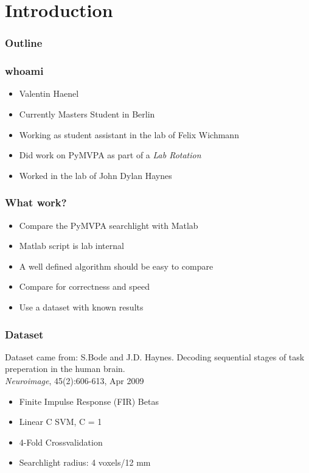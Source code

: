 
\section{Introduction}



\begin{frame}
 \frametitle{Outline}
  


\tableofcontents[currentsection]

  
 \end{frame}
\begin{frame}
 \frametitle{whoami}
  


\begin{itemize}
  \item Valentin Haenel
  \item Currently Masters Student in Berlin
  \item Working as student assistant in the lab of Felix Wichmann
  \item Did work on PyMVPA as part of a \textit{Lab Rotation}
  \item Worked in the lab of John Dylan Haynes
\end{itemize}

  
 \end{frame}
\begin{frame}
 \frametitle{What work?}
  


\begin{itemize}
  \item Compare the PyMVPA searchlight with Matlab
  \item Matlab script is lab internal
  \item A well defined algorithm should be easy to compare
  \item Compare for correctness and speed
  \item Use a dataset with known results
\end{itemize}

  
 \end{frame}
\begin{frame}
 \frametitle{Dataset}
  


\begin{block}{Dataset came from:}
S.Bode and J.D. Haynes. Decoding sequential stages of task preperation in the human brain.\\
\emph{Neuroimage}, 45(2):606-613, Apr 2009
\end{block}

\begin{itemize}
  \item Finite Impulse Response (FIR) Betas
  \item Linear C SVM, C = 1
  \item 4-Fold Crossvalidation
  \item Searchlight radius: 4 voxels/12 mm
\end{itemize}

  
 \end{frame}
